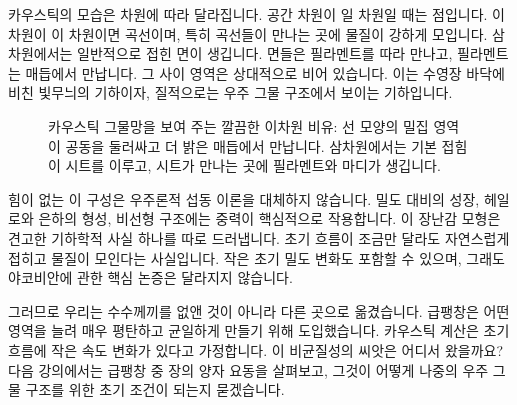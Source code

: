 카우스틱의 모습은 차원에 따라 달라집니다. 공간 차원이 일 차원일 때는 점입니다. 이 차원이 이 차원이면 곡선이며, 특히 곡선들이 만나는 곳에 물질이 강하게 모입니다. 삼차원에서는 일반적으로 접힌 면이 생깁니다. 면들은 필라멘트를 따라 만나고, 필라멘트는 매듭에서 만납니다. 그 사이 영역은 상대적으로 비어 있습니다. 이는 수영장 바닥에 비친 빛무늬의 기하이자, 질적으로는 우주 그물 구조에서 보이는 기하입니다.

\begin{figure}[htbp]\centering
{}\caption{카우스틱 그물망을 보여 주는 깔끔한 이차원 비유: 선 모양의 밀집 영역이 공동을 둘러싸고 더 밝은 매듭에서 만납니다. 삼차원에서는 기본 접힘이 시트를 이루고, 시트가 만나는 곳에 필라멘트와 마디가 생깁니다.}\label{fig:c09-caustic-network}\end{figure}

힘이 없는 이 구성은 우주론적 섭동 이론을 대체하지 않습니다. 밀도 대비의 성장, 헤일로와 은하의 형성, 비선형 구조에는 중력이 핵심적으로 작용합니다. 이 장난감 모형은 견고한 기하학적 사실 하나를 따로 드러냅니다. 초기 흐름이 조금만 달라도 자연스럽게 접히고 물질이 모인다는 사실입니다. 작은 초기 밀도 변화도 포함할 수 있으며, 그래도 야코비안에 관한 핵심 논증은 달라지지 않습니다.

그러므로 우리는 수수께끼를 없앤 것이 아니라 다른 곳으로 옮겼습니다. 급팽창은 어떤 영역을 늘려 매우 평탄하고 균일하게 만들기 위해 도입했습니다. 카우스틱 계산은 초기 흐름에 작은 속도 변화가 있다고 가정합니다. 이 비균질성의 씨앗은 어디서 왔을까요? 다음 강의에서는 급팽창 중 장의 양자 요동을 살펴보고, 그것이 어떻게 나중의 우주 그물 구조를 위한 초기 조건이 되는지 묻겠습니다.

